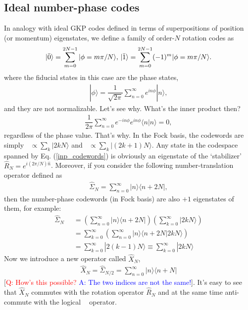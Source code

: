 \documentclass{article}
\DeclareMathOperator{\lgcZ}{\bar{Z}}
\DeclareMathOperator{\lgczero}{|\bar{0}\rangle}
\DeclareMathOperator{\lgcone}{|\bar{1}\rangle}
\begin{document}
\subsection{Ideal number-phase codes}
In analogy with ideal GKP codes defined in terms of superpositions of position (or momentum) eigenstates, we define a family of order-$N$ rotation codes as 
\begin{equation}\label{inp_codewords}
    \lgczero = \sum_{m=0}^{2N-1}|\phi=m\pi/N\rangle,\\
    \lgcone = \sum_{m=0}^{2N-1}(-1)^m|\phi=m\pi/N\rangle.
\end{equation}
where the fiducial states in this case are the phase states,
\begin{align}
    |\phi\rangle= \dfrac{1}{\sqrt{2\pi}}\sum_{n=0}^{\infty} e^{in\phi}|n\rangle,
\end{align}
and they are not normalizable. Let's see why. What's the inner product then?
\begin{align}
    \dfrac{1}{2\pi}\sum_{n=0}^{\infty}e^{-in\phi}e^{in\phi}\langle n|n\rangle=0,
\end{align}
regardless of the phase value. That's why. In the Fock basis, the codewords are simply $\lgczero\propto \sum_k|2kN\rangle$ and $\lgcone\propto\sum_k|(2k+1)N\rangle$. Any state in the codespace spanned by Eq. (\ref{inp_codewords}) is obviously an eigenstate of the `stabilizer' $\hat{R}_N=e^{i(2\pi/N)\hat{n}}$. Moreover, if you consider the following number-translation operator defined as
\begin{align}
\hat{\Sigma}_{N}=\sum_{n=0}^{\infty}|n\rangle\langle n + 2N|,
\end{align}
then the number-phase codewords (in Fock basis) are also $+1$ eigenstates of them, for example:
\begin{align}
    \hat{\Sigma}_N\lgczero &= \left(\sum_{n=0}^\infty |n\rangle \langle n+2N|\right)\left(\sum_{k=0}^\infty |2kN\rangle \right)\\
    &=\sum_{k=0}^\infty\left(\sum_{n=0}^\infty|n\rangle\langle n+2N|2kN\rangle\right)\\
    &=\sum_{k=0}^\infty|2(k-1)N\rangle\equiv \sum_{k=0}^\infty |2kN\rangle 
\end{align}
Now we introduce a new operator called $\hat{X}_N$,
\begin{align}
    \hat{X}_N = \hat{\Sigma}_{N/2} = \sum_{n=0}^\infty |n\rangle \langle n +N|
\end{align}
[\textcolor{red}{Q: How's this possible?} \textcolor{blue}{A: The two indices are not the same!}]. It's easy to see that $\hat{X}_N$ commutes with the rotation operator $\hat{R}_N$ and at the same time anti-commute with the logical $\lgcZ$ operator. 
\end{document}
